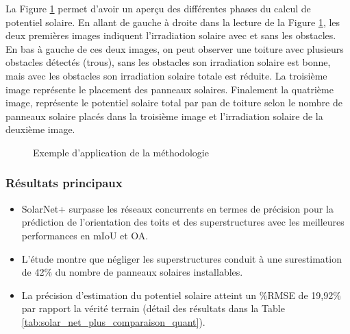 {{{{\par{La Figure \ref{fig:solar_net_plus_exemple_methodo} permet d'avoir un aperçu des différentes phases du calcul de potentiel solaire. En allant de gauche à droite dans la lecture de la Figure \ref{fig:solar_net_plus_exemple_methodo}, les deux premières images indiquent l'irradiation solaire avec et sans les obstacles. En bas à gauche de ces deux images, on peut observer une toiture avec plusieurs obstacles détectés (trous), sans les obstacles son irradiation solaire est bonne, mais avec les obstacles son irradiation solaire totale est réduite. La troisième image représente le placement des panneaux solaires. Finalement la quatrième image, représente le potentiel solaire total par pan de toiture selon le nombre de panneaux solaire placés dans la troisième image et l'irradiation solaire de la deuxième image.}

\begin{figure}[H]
    \caption{Exemple d'application de la méthodologie \cite{li_deep_2024}}
    \label{fig:solar_net_plus_exemple_methodo}
\end{figure}

\subsubsection{Résultats principaux}
\begin{itemize}
    \item SolarNet+ surpasse les réseaux concurrents en termes de précision pour la prédiction de l'orientation des toits et des superstructures avec les meilleures performances en mIoU et OA.
    \item L'étude montre que négliger les superstructures conduit à une surestimation de 42\% du nombre de panneaux solaires installables.
    \item La précision d'estimation du potentiel solaire atteint un \%RMSE de 19,92\% par rapport la vérité terrain (détail des résultats dans la Table \ref{tab:solar_net_plus_comparaison_quant}).
\end{itemize}

}}}}
